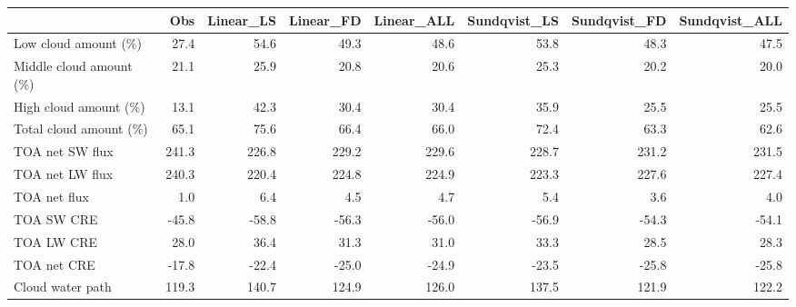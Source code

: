 \begin{tabular}{lrrrrrrr}
\toprule
{} &   Obs &  Linear\_LS &  Linear\_FD &  Linear\_ALL &  Sundqvist\_LS &  Sundqvist\_FD &  Sundqvist\_ALL \\
\midrule
Low cloud amount (\%)    &  27.4 &       54.6 &       49.3 &        48.6 &          53.8 &          48.3 &           47.5 \\
Middle cloud amount (\%) &  21.1 &       25.9 &       20.8 &        20.6 &          25.3 &          20.2 &           20.0 \\
High cloud amount (\%)   &  13.1 &       42.3 &       30.4 &        30.4 &          35.9 &          25.5 &           25.5 \\
Total cloud amount (\%)  &  65.1 &       75.6 &       66.4 &        66.0 &          72.4 &          63.3 &           62.6 \\
TOA net SW flux         & 241.3 &      226.8 &      229.2 &       229.6 &         228.7 &         231.2 &          231.5 \\
TOA net LW flux         & 240.3 &      220.4 &      224.8 &       224.9 &         223.3 &         227.6 &          227.4 \\
TOA net flux            &   1.0 &        6.4 &        4.5 &         4.7 &           5.4 &           3.6 &            4.0 \\
TOA SW CRE              & -45.8 &      -58.8 &      -56.3 &       -56.0 &         -56.9 &         -54.3 &          -54.1 \\
TOA LW CRE              &  28.0 &       36.4 &       31.3 &        31.0 &          33.3 &          28.5 &           28.3 \\
TOA net CRE             & -17.8 &      -22.4 &      -25.0 &       -24.9 &         -23.5 &         -25.8 &          -25.8 \\
Cloud water path        & 119.3 &      140.7 &      124.9 &       126.0 &         137.5 &         121.9 &          122.2 \\
\bottomrule
\end{tabular}
